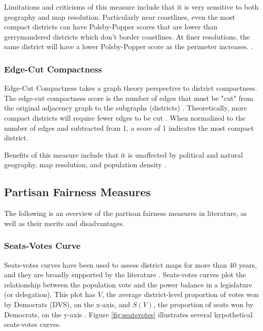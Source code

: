 Limitations and criticisms of this measure include that it is very sensitive to both geography and map resolution. Particularly near coastlines, even the most compact districts can have Polsby-Popper scores that are lower than gerrymandered districts which don't border coastlines. At finer resolutions, the same district will have a lower Polsby-Popper score as the perimeter increases. \parencite[12]{mccartan2020}.

\subsubsection{Edge-Cut Compactness}
\label{sec:edgecut}

Edge-Cut Compactness takes a graph theory perspective to district compactness. The edge-cut compactness score is the number of edges that must be "cut" from the original adjacency graph to the subgraphs (districts) \parencite{dube2016}. Theoretically, more compact districts will require fewer edges to be cut \parencite{dube2016}. When normalized to the number of edges and subtracted from 1, a score of 1 indicates the most compact district. 

Benefits of this measure include that it is unaffected by political and natural geography, map resolution, and population density \parencite[11]{mccartan2020}. 

\subsection{Partisan Fairness Measures}

The following is an overview of the partisan fairness measures in literature, as well as their merits and disadvantages. 

\subsubsection{Seats-Votes Curve}

Seats-votes curves have been used to assess district maps for more than 40 years, and they are broadly supported by the literature \parencite{katz2020}. Seats-votes curves plot the relationship between the population vote and the power balance in a legislature (or delegation). This plot has $V$, the average district-level proportion of votes won by Democrats (DVS), on the x-axis, and $S(V)$, the proportion of seats won by Democrats, on the y-axis \parencite{tufte1973}. Figure \ref{fig:seatsvotes} illustrates several hypothetical seats-votes curves.

